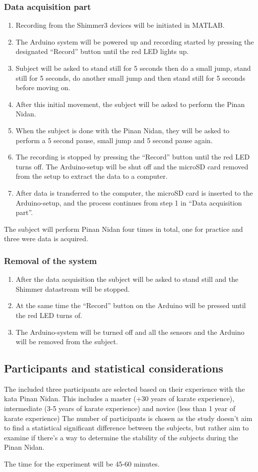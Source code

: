 \subsubsection{Data acquisition part}
\begin{enumerate}
\item Recording from the Shimmer3 devices will be initiated in MATLAB.
\item The Arduino system will be powered up and recording started by pressing the designated “Record” button until the red LED lights up.
\item Subject will be asked to stand still for 5 seconds then do a small jump, stand still for 5 seconds, do another small jump and then stand still for 5 seconds before moving on.
\item After this initial movement, the subject will be asked to perform the Pinan Nidan.
\item When the subject is done with the Pinan Nidan, they will be asked to perform a 5 second pause, small jump and 5 second pause again.
\item The recording is stopped by pressing the “Record” button until the red LED turns off. The Arduino-setup will be shut off and the microSD card removed from the setup to extract the data to a computer.
\item After data is transferred to the computer, the microSD card is inserted to the Arduino-setup, and the process continues from step 1 in “Data acquisition part”.
\end{enumerate}

The subject will perform Pinan Nidan four times in total, one for practice and three were data is acquired.

\subsubsection{Removal of the system}
\begin{enumerate}
\item After the data acquisition the subject will be asked to stand still and the Shimmer datastream will be stopped. 
\item At the same time the “Record” button on the Arduino will be pressed until the red LED turns of. 
\item The Arduino-system will be turned off and all the sensors and the Arduino will be removed from the subject.
\end{enumerate}

\subsection{Participants and statistical considerations}
The included three participants are selected based on their experience with the kata Pinan Nidan. This includes a master (+30 years of karate experience), intermediate (3-5 years of karate experience) and novice (less than 1 year of karate experience) The number of participants is chosen as the study doesn’t aim to find a statistical significant difference between the subjects, but rather aim to examine if there’s a way to determine the stability of the subjects during the Pinan Nidan.

The time for the experiment will be 45-60 minutes.
